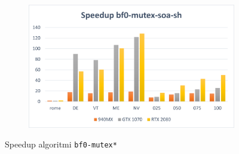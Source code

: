 \documentclass[12pt,a4paper]{book} %
\begin{document}
\begin{figure}[b]
\begin{subfigure}{.5\textwidth}
		\end{subfigure}%
		\begin{subfigure}{.5\textwidth}
			\centering
			\includegraphics[width=\textwidth]{speedup_bf0-mutex-soa-sh}
		\end{subfigure}
		\caption{Speedup algoritmi \texttt{bf0-mutex*}}
		\label{fig:speedup_bf0-mutex}
	\end{figure}
\end{document}
